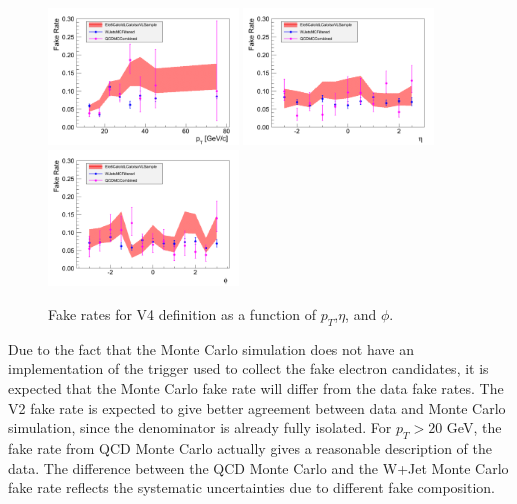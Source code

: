 \begin{figure}[!htbp]
\begin{center}
\includegraphics[width=0.45\textwidth]{figures/ElectronFakeRate_DenominatorV4_ptThreshold30_Pt.pdf}
\includegraphics[width=0.45\textwidth]{figures/ElectronFakeRate_DenominatorV4_ptThreshold30_Eta.pdf}
\includegraphics[width=0.45\textwidth]{figures/ElectronFakeRate_DenominatorV4_ptThreshold30_Phi.pdf}
\caption{Fake rates for V4 definition as a function of $p_T$,$\eta$, and $\phi$.}
\label{fig:ele_fr_V4_jet30}
\end{center}
\end{figure}

Due to the fact that the Monte Carlo simulation does not have an implementation of the trigger used
to collect the fake electron candidates, it is expected that the Monte Carlo fake rate will differ
from the data fake rates. The V2 fake rate is expected to give better agreement between data and 
Monte Carlo simulation, since the denominator is already fully isolated. For $p_{T} > 20$ GeV, 
the fake rate from QCD Monte Carlo actually gives a reasonable description of the data. The difference
between the QCD Monte Carlo and the W+Jet Monte Carlo fake rate reflects the systematic uncertainties
due to different fake composition.

